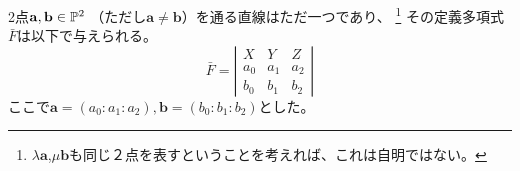 \documentclass[a4paper]{jsarticle}
\begin{document}
    \begin{Prop}
        2点$\mathbf{a}, \mathbf{b} \in \mathbb{P}^2$
        （ただし$\mathbf{a} \neq \mathbf{b}$）を通る直線はただ一つであり、
        \footnote{$\lambda \mathbf{a}$,$\mu \mathbf{b}$も同じ２点を表すということを考えれば、これは自明ではない。}
        その定義多項式$\bar{F}$は以下で与えられる。
        \[
        \bar{F}=
          \left|
              \begin{array}{ccc}
                  X & Y & Z \\
                  a_0 & a_1 & a_2 \\
                  b_0 & b_1 & b_2
              \end{array}
          \right|
        \]
        ここで$\mathbf{a}=(a_0 : a_1 : a_2), \mathbf{b}=(b_0 : b_1 : b_2)$とした。
    \end{Prop}
\end{document}
